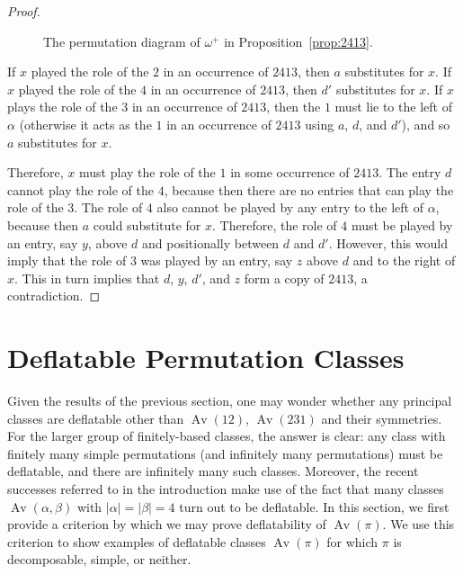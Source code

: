 \documentclass[10pt]{article}
\theoremstyle{plain}
\newcommand{\Av}{\operatorname{Av}}
\begin{document}
\begin{proof}
\begin{figure}
\begin{center}
		\caption{The permutation diagram of $\omega^+$ in Proposition~\ref{prop:2413}.}
		\label{figure:2413-1}
	\end{center}
\end{figure}
	
	If $x$ played the role of the $2$ in an occurrence of $2413$, then $a$ substitutes for $x$. If $x$ played the role of the $4$ in an occurrence of $2413$, then $d'$ substitutes for $x$. If $x$ plays the role of the $3$ in an occurrence of $2413$, then the $1$ must lie to the left of $\alpha$ (otherwise it acts as the $1$ in an occurrence of $2413$ using $a$, $d$, and $d'$), and so $a$ substitutes for $x$. 
	
	Therefore, $x$ must play the role of the $1$ in some occurrence of $2413$. The entry $d$ cannot play the role of the $4$, because then there are no entries that can play the role of the $3$. The role of $4$ also cannot be played by any entry to the left of $\alpha$, because then $a$ could substitute for $x$. Therefore, the role of $4$ must be played by an entry, say $y$, above $d$ and positionally between $d$ and $d'$. However, this would imply that the role of $3$ was played by an entry, say $z$ above $d$ and to the right of $x$. This in turn implies that $d$, $y$, $d'$, and $z$ form a copy of $2413$, a contradiction.	
\end{proof}


\section{Deflatable Permutation Classes}
\label{section:def}

Given the results of the previous section, one may wonder whether any principal classes are deflatable other than $\Av(12)$, $\Av(231)$ and their symmetries. For the larger group of finitely-based classes, the answer is clear: any class with finitely many simple permutations (and infinitely many permutations) must be deflatable, and there are infinitely many such classes. Moreover, the recent successes referred to in the introduction make use of the fact that many classes $\Av(\alpha, \beta)$ with $|\alpha| = |\beta| = 4$ turn out to be deflatable. In this section, we first provide a criterion by which we may prove deflatability of $\Av(\pi)$. We use this criterion to show examples of deflatable classes $\Av(\pi)$ for which $\pi$ is decomposable, simple, or neither.
\end{document}

